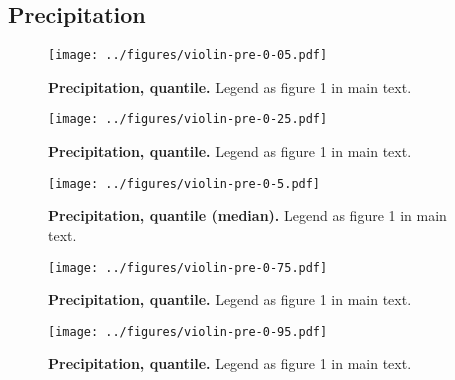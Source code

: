 \documentclass[12pt]{report}
\begin{document}
\subsection{Precipitation}
\begin{figure}[h!]
  \begin{center}
    \texttt{[image: ../figures/violin-pre-0-05.pdf]}
  \end{center}
  \caption{\textbf{Precipitation,  quantile.} Legend as
    figure 1 in main text.}
\end{figure}
\begin{figure}[h!]
  \begin{center}
    \texttt{[image: ../figures/violin-pre-0-25.pdf]}
  \end{center}
  \caption{\textbf{Precipitation,  quantile.} Legend as
    figure 1 in main text.}
\end{figure}
\begin{figure}[h!]
  \begin{center}
    \texttt{[image: ../figures/violin-pre-0-5.pdf]}
  \end{center}
  \caption{\textbf{Precipitation,  quantile (median).}
    Legend as figure 1 in main text.}
\end{figure}
\begin{figure}[h!]
  \begin{center}
    \texttt{[image: ../figures/violin-pre-0-75.pdf]}
  \end{center}
  \caption{\textbf{Precipitation,  quantile.} Legend as
    figure 1 in main text.}
\end{figure}
\begin{figure}[h!]
  \begin{center}
    \texttt{[image: ../figures/violin-pre-0-95.pdf]}
  \end{center}
  \caption{\textbf{Precipitation,  quantile.} Legend as
    figure 1 in main text.}
\end{figure}

\clearpage
\end{document}
